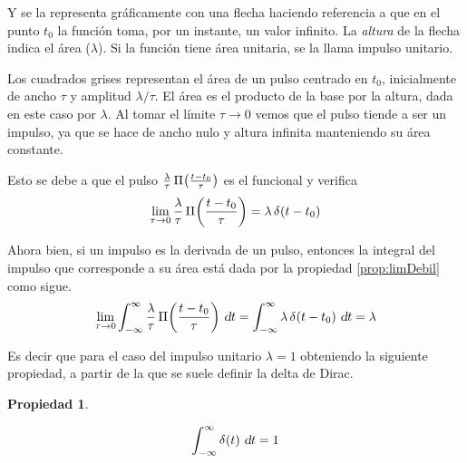 \documentclass[a5paper,12pt,twoside]{book}
\newtheorem{prop}{{Propiedad}}[chapter]
\begin{document}
Y se la representa gráficamente con una flecha haciendo referencia a que en el punto $t_0$ la función toma, por un instante, un valor infinito. La \emph{altura} de la flecha indica el área ($\lambda$). Si la función tiene área unitaria, se la llama impulso unitario.


Los cuadrados grises representan el área de un pulso centrado en $t_0$, inicialmente de ancho $\tau$ y amplitud $\lambda / \tau$. El área es el producto de la base por la altura, dada en este caso por $\lambda$. Al tomar el límite $\tau \to 0$ vemos que el pulso tiende a ser un impulso, ya que se hace de ancho nulo y altura infinita manteniendo su área constante.

Esto se debe a que el pulso $\frac{\lambda}{\tau} \, \fx[\Pi]{\frac{t-t_0}{\tau}}$ es el funcional y verifica
\begin{equation*}
    \lim_{\tau \to 0} \frac{\lambda}{\tau} \, \fx[\Pi]{\frac{t-t_0}{\tau}} = \lambda \, \fx[\delta]{t-t_0}
\end{equation*}

Ahora bien, si un impulso es la derivada de un pulso, entonces la integral del impulso que corresponde a su área está dada por la propiedad \ref{prop:limDebil} como sigue.
\begin{equation*}
    \lim_{\tau \to 0} \int_{-\infty}^\infty \frac{\lambda}{\tau} \, \fx[\Pi]{\frac{t-t_0}{\tau}} \, \dif t
    = \int_{-\infty}^\infty \lambda \, \fx[\delta]{t-t_0} \, \dif t
    = \lambda
\end{equation*}

Es decir que para el caso del impulso unitario $\lambda = 1$ obteniendo la siguiente propiedad, a partir de la que se suele definir la delta de Dirac.

\begin{mdframed}[style=MyFrame1]
    \begin{prop}
    \end{prop}
    \begin{equation*}
        \int_{-\infty}^\infty \fx[\delta]{t} \, \dif t = 1
    \end{equation*}
\end{mdframed}
\end{document}
